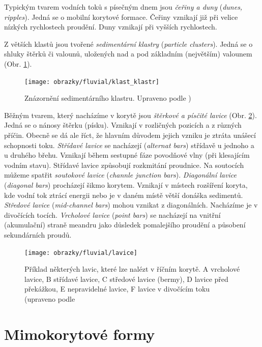 Typickým tvarem vodních toků s písečným dnem jsou \emph{čeřiny a duny} (\textit{dunes, ripples}). Jedná se o mobilní korytové formace. Čeřiny vznikají již při velice nízkých rychlostech proudění. Duny vznikají při vyšších rychlostech. 

Z větších klastů jsou tvořené \emph{sedimentární klastry} (\textit{particle clusters}). Jedná se o shluky štěrků či valounů, uložených nad a pod základním (největším) valounem (Obr. \ref{fig:klastklastr}). 

\begin{figure}
	\centering
	\texttt{[image: obrazky/fluvial/klast\_klastr]}
	\caption{Znázornění sedimentárního klastru. Upraveno podle \textcite{galiaFluvialniGeomorfologie2017})}
	\label{fig:klastklastr}
\end{figure}

Běžným tvarem, který nacházíme v korytě jsou \emph{štěrkové a písčité lavice} (Obr. \ref{fig:lavice}). Jedná se o nánosy štěrku (písku). Vznikají v rozličných pozicích a z různých příčin. Obecně se dá ale říct, že hlavním důvodem jejich vzniku je ztráta unášecí schopnosti toku. \emph{Střídavé lavice} se nacházejí (\textit{alternat bars}) střídavě u jednoho a u druhého břehu. Vznikají během sestupné fáze povodňové vlny (při klesajícím vodním stavu). Střídavé lavice způsobují rozkmitání proudnice. Na soutocích můžeme spatřit \emph{soutokové lavice} (\textit{channle junction bars}). \emph{Diagonální lavice} (\textit{diagonal bars}) procházejí šikmo korytem. Vznikají v místech rozšíření koryta, kde vodní tok ztrácí energii nebo je v daném místě větší donáška sedimentů. \emph{Středové lavice} (\textit{mid-channel bars}) mohou vznikat z diagonálních. Nacházíme je v divočících tocích. \emph{Vrcholové lavice} (\textit{point bars}) se nacházejí na vnitřní (akumulační) straně meandru jako důsledek pomalejšího proudění a působení sekundárních proudů.

\begin{figure}
	\centering
	\texttt{[image: obrazky/fluvial/lavice]}
	\caption{Příklad některých lavic, které lze nalézt v říčním korytě. A vrcholové lavice, B střídavé lavice, C středové lavice (bermy), D lavice před překážkou, E nepravidelné lavice, F lavice v divočícím toku  (upraveno podle \textcite{radecki-pawlikStreamHydraulicsGranulometry2004} }
	\label{fig:lavice}
\end{figure}

\section{Mimokorytové formy}
